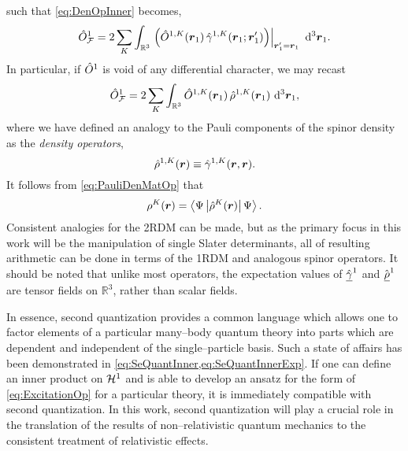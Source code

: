 such that \cref{eq:DenOpInner} becomes,
\begin{equation}
  \hat{O}_{\mathcal{F}}^1 = 2\sum_K \int_{\mathbb R^3} 
    \left.\left(\hat{O}^{1,K} (\boldsymbol{r}_1) \, \hat{\gamma}^{1,K}(\boldsymbol{r}_1; \boldsymbol{r}'_1) \right) \right\vert_{\boldsymbol{r}'_1 = \boldsymbol{r}_1 } 
    \,\,\mathrm{d}^3 \boldsymbol{r}_1.
\end{equation}
In particular, if $\hat{O}^1$ is void of any differential character, we may recast
\begin{equation}
  \label{eq:ScalarDenFieldOp}
  \hat{O}_{\mathcal{F}}^1 = 2\sum_K \int_{\mathbb R^3} 
    \hat{O}^{1,K} (\boldsymbol{r}_1) \, \hat{\rho}^{1,K}(\boldsymbol{r}_1)  
    \,\,\mathrm{d}^3 \boldsymbol{r}_1,
\end{equation}
where we have defined an analogy to the Pauli components of the spinor density as
the \emph{density operators},
\begin{equation}
\hat{\rho}^{1,K}(\boldsymbol{r}) \equiv \hat{\gamma}^{1,K}(\boldsymbol{r},\boldsymbol{r}).
\end{equation}
It follows from \cref{eq:PauliDenMatOp} that
\begin{equation}
\rho^K(\boldsymbol{r}) = \left\langle \Psi \left\vert \hat{\rho}^K(\boldsymbol{r}) \right\vert \Psi \right\rangle.
\end{equation}
Consistent analogies for the 2RDM can be made, but as the primary focus in this work will be the manipulation
of single Slater determinants, all of resulting arithmetic can be done in terms of the 1RDM and analogous
spinor operators. It should be noted that unlike most operators, the expectation values of 
$\hat{\underline{\gamma}}^1$ and $\hat{\underline{\rho}}^1$ are tensor fields on $\mathbb R^3$, rather than scalar fields.


In essence, second quantization provides a common language which allows one to factor elements of a particular many--body
quantum theory into parts which are dependent and independent of the single--particle basis. Such a state of affairs has
been demonstrated in \cref{eq:SeQuantInner,eq:SeQuantInnerExp}. If one can define an inner product on $\mathcal{H}^1$ and
is able to develop an ansatz for the form of \cref{eq:ExcitationOp} for a particular theory, it is immediately compatible
with second quantization. In this work, second quantization will play a crucial role in the translation of the
results of non--relativistic quantum mechanics to the consistent treatment of relativistic effects.



